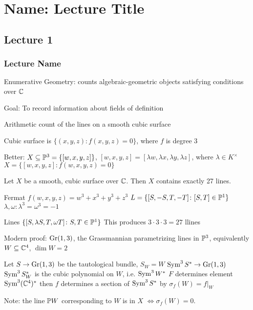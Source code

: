 \newpage
\section{Name: Lecture Title}
\subsection{Lecture 1}
\subsubsection{Lecture Name}

Enumerative Geometry: counts algebraic-geometric objects satisfying conditions over $\C$

Goal: To record information about fields of definition

Arithmetic count of the lines on a smooth cubic surface

\begin{dfn}
Cubic surface is $\{ (x,y,z) \colon f(x,y,z)=0 \}$, where $f$ is degree 3
\end{dfn}


Better: $X \subseteq \P^3= \{ [w,x,y,z] \}$, $[w,x,y,z]= [\lambda w,\lambda x, \lambda y, \lambda z]$, where $\lambda \in K^\times$
$X= \{[w,x,y,z] \colon f(w,x,y,z)=0\}$

\begin{thm}
Let $X$ be a smooth, cubic surface over $\C$. Then $X$ contains exactly 27 lines.
\end{thm}


\begin{ex}
Fermat
$f(w,x,y,z)= w^3+x^3+y^3+z^3$
$L= \{[S,-S,T,-T] \colon [S,T] \in \P^1\}$
$\lambda,\omega: \lambda^3=\omega^3= -1$

Lines $\{ [S,\lambda S,T,\omega T] \colon S,T \in \P^1\}$
This produces $3 \cdot 3 \cdot 3= 27$ llines
\end{ex}


Modern proof: $\gr(1,3)$, the Grassmannian parametrizing lines in $\P^3$, equivalently $W \subseteq \C^4$, $\dim W=2$

Let $S \to \gr(1,3)$ be the tautological bundle, $S_W= W$
$\sym^3 S^* \to \gr(1,3)$
$\sym^3S^*_W$ is the cubic polynomial on $W$, i.e. $\sym^3 W^*$
$F$ determines element $\sym^3(\C^4)^*$ then $f$ determines a section of $\sym^3S^*$ by $\sigma_f(W)= f\big|_W$

Note: the line $\P W$ corresponding to $W$ is in $X$ $\Leftrightarrow \sigma_f(W)=0$.

